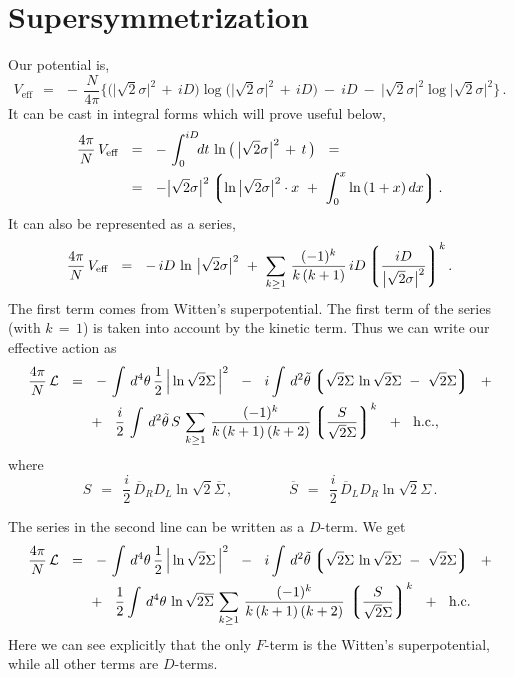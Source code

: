 \documentclass[epsfig,12pt]{article}
\def\beq{\begin{equation}}
\def\eeq{\end{equation}}
\newcommand{\cell}{{\mathcal L}}
\newcommand{\ov}{\overline}
\newcommand{\lgr}{\left\lgroup}
\newcommand{\rgr}{\right\rgroup}
\begin{document}
\section{Supersymmetrization}
	Our potential is,
\beq
\label{Veff}
	V_\text{eff}    ~~=~~    -\, \frac{N}{4\pi} 
	\bigg\{
		\big( \big|\sqrt{2}\sigma\big|^2 \,+\, iD \big) 
		\log \big( \big|\sqrt{2}\sigma\big|^2 \,+\, iD \big)
		~-~
		iD
		~-~
		\big|\sqrt{2}\sigma\big|^2 \log \big|\sqrt{2}\sigma\big|^2
	\bigg\}\,.
\eeq
	It can be cast in integral forms which will prove useful below,
\begin{align}
%
\notag
	\frac{4\pi}{N}\, V_\text{eff} &    ~~=~~    -\, \int_0^{iD} \!\!dt\, \ln \big(\, \big|\sqrt{2}\sigma\big|^2 \,+\, t \,\big)
	~~=
	\\
%
	&
	~~=~~    - \big|\sqrt{2}\sigma\big|^2 \lgr \ln \big|\sqrt{2}\sigma\big|^2 \cdot x ~+~
						\int_0^x \ln\, (1 + x)\, dx \rgr.
\end{align}
	It can also be represented as a series,
\beq
\label{Vser}
	 \frac{4\pi}{N}\, V_\text{eff}    ~~=~~
		-\,iD\, \ln\, \big|\sqrt{2}\sigma\big|^2 ~+~
		\sum_{k \geq 1}\, \frac{(-1)^k} 
                                      { k\,(k + 1) }\, iD \lgr \frac{ iD } 
                                                       { \big|\sqrt{2}\sigma\big|^2 } \rgr^k .
\eeq
	The first term comes from Witten's superpotential.
	The first term of the series (with $ k \,=\, 1 $) is taken into account by the kinetic term.
	Thus we can write our effective action as
\begin{align}
%
\notag
	\frac{4\pi}{N}\,\cell &    ~~=~~
			-\,
			\int\, d^4\theta\, \frac{1}{2}\, \Big| \ln \sqrt{2}\Sigma \, \Big|^2
			~~-~~
			i \int\, d^2\tilde\theta 
			\lgr
			\sqrt{2}\Sigma\, \ln \sqrt{2}\Sigma  ~-~ \sqrt{2}\Sigma
			\rgr
			~~+
	\\
%
\label{sseries}
	&
			\phantom{~~=~~}
			+~~
			\frac{i}{2}\, 
			\int\, d^2\tilde\theta\,
			S\,
			\sum_{k \geq 1}\, \frac{    (-1)^k    }
                                           {  k\,(k + 1)\,(k + 2)  } \lgr \frac{S}{\sqrt{2}\Sigma} \rgr^k
			~~+~~ \text{h.c.},
\end{align}
	where
\beq
	S    ~~=~~    \frac{i}{2}\,\ov D{}_R D_L \ln \sqrt{2}\ov\Sigma\,,
	\qquad\qquad
	\ov S    ~~=~~    \frac{i}{2}\, \ov D{}_L D_R \ln \sqrt{2}\Sigma\,.
\eeq

	The series in the second line can be written as a $ D $-term.
	We get
\begin{align}
%
\notag
	\frac{4\pi}{N}\, \cell &    ~~=~~     
			-\,
			\int\, d^4\theta\, \frac{1}{2}\, \Big| \ln \sqrt{2}\Sigma \, \Big|^2
			~~-~~
			i \int\, d^2\tilde\theta 
			\lgr
			\sqrt{2}\Sigma\, \ln \sqrt{2}\Sigma  ~-~ \sqrt{2}\Sigma
			\rgr
			~~+
	\\
%
	&
			\phantom{~~=~~}
			+~~ 
			\frac{1}{2} \int\, d^4\theta\,
			\ln \sqrt{2}\ov\Sigma\,
			\sum_{k \geq 1}\, \frac{    (-1)^k    }
                                           {  k\,(k + 1)\,(k + 2)  }\, \lgr \frac{S}{\sqrt{2}\Sigma} \rgr^k
	~~+~~ \text{h.c.}
\end{align}
	Here we can see explicitly that the only $ F $-term is the Witten's superpotential,
	while all other terms are $ D $-terms.
\end{document}

